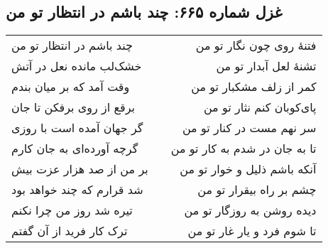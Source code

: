 \begin{center}
\section*{غزل شماره ۶۶۵: چند باشم در انتظار تو من}
\label{sec:665}
\begin{longtable}{l p{0.5cm} r}
چند باشم در انتظار تو من
&&
فتنهٔ روی چون نگار تو من
\\
خشک‌لب مانده نعل در آتش
&&
تشنهٔ لعل آبدار تو من
\\
وقت آمد که بر میان بندم
&&
کمر از زلف مشکبار تو من
\\
برقع از روی برفکن تا جان
&&
پای‌کوبان کنم نثار تو من
\\
گر جهان آمده است با روزی
&&
سر نهم مست در کنار تو من
\\
گرچه آورده‌ای به جان کارم
&&
تا به جان در شدم به کار تو من
\\
بر من از صد هزار عزت بیش
&&
آنکه باشم ذلیل و خوار تو من
\\
شد قرارم که چند خواهد بود
&&
چشم بر راه بیقرار تو من
\\
تیره شد روز من چرا نکنم
&&
دیده روشن به روزگار تو من
\\
ترک کار فرید از آن گفتم
&&
تا شوم فرد و یار غار تو من
\\
\end{longtable}
\end{center}
